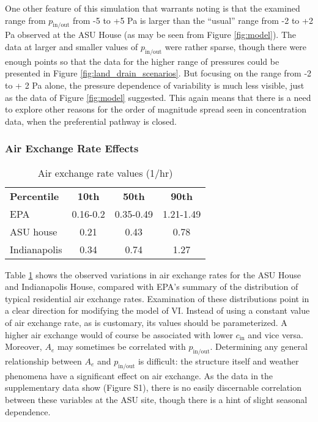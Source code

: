 \documentclass[journal=esthag,manuscript=article]{achemso}
\begin{document}
One other feature of this simulation that warrants noting is that the examined range from $p_\mathrm{in/out}$ from -5 to +5 Pa is larger than the “usual” range from -2 to +2 Pa observed at the ASU House (as may be seen from Figure \ref{fig:model}).
The data at larger and smaller values of $p_\mathrm{in/out}$ were rather sparse, though there were enough points so that the data for the higher range of pressures could be presented in Figure \ref{fig:land_drain_scenarios}.
But focusing on the range from -2 to + 2 Pa alone, the pressure dependence of variability is much less visible, just as the data of Figure \ref{fig:model} suggested.
This again means that there is a need to explore other reasons for the order of magnitude spread seen in concentration data, when the preferential pathway is closed.\par

\subsubsection{Air Exchange Rate Effects}

\begin{table}[htb!]
 \caption{Air exchange rate values (1/hr)}\label{tbl:air_exchange_rate}
 \begin{tabular}{l c c c}
  \toprule
  \textbf{Percentile}                                                     & \textbf{10th} & \textbf{50th} & \textbf{90th} \\
  EPA\cite{u.s._epa_exposure_2011,m._d._koontz_estimation_1995}           & 0.16-0.2      & 0.35-0.49     & 1.21-1.49     \\
  ASU house\cite{holton_temporal_2013,guo_identification_2015}            & 0.21          & 0.43          & 0.78          \\
  Indianapolis\cite{u.s._environmental_protection_agency_assessment_2015} & 0.34          & 0.74          & 1.27          \\
  \bottomrule
 \end{tabular}
\end{table}

Table \ref{tbl:air_exchange_rate} shows the observed variations in air exchange rates for the ASU House and Indianapolis House, compared with EPA’s summary of the distribution of typical residential air exchange rates\cite{u.s._epa_exposure_2011,m._d._koontz_estimation_1995}.
Examination of these distributions point in a clear direction for modifying the model of VI.
Instead of using a constant value of air exchange rate, as is customary, its values should be parameterized.
A higher air exchange would of course be associated with lower $c_\mathrm{in}$ and vice versa.
Moreover, $A_e$ may sometimes be correlated with $p_\mathrm{in/out}$.
Determining any general relationship between $A_e$ and $p_\mathrm{in/out}$ is difficult: the structure itself and weather phenomena have a significant effect on air exchange.
As the data in the supplementary data show (Figure S1), there is no easily discernable correlation between these variables at the ASU site, though there is a hint of slight seasonal dependence.\par
\end{document}
